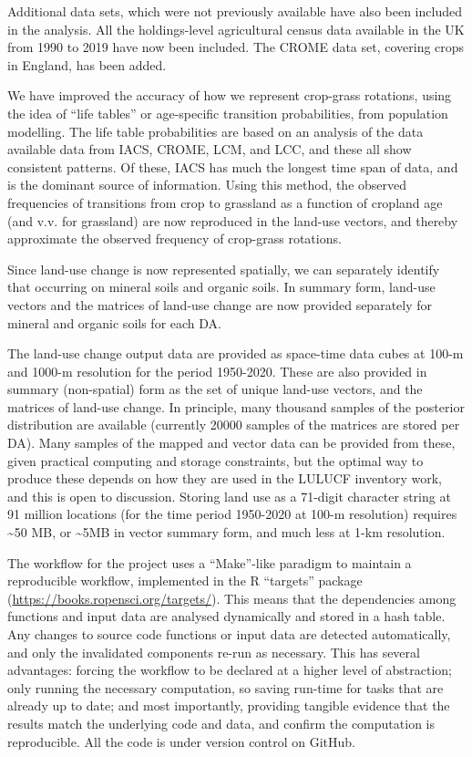\documentclass[
]{book}
\begin{document}
Additional data sets, which were not previously available have also been included in the analysis. All the holdings-level agricultural census data available in the UK from 1990 to 2019 have now been included. The CROME data set, covering crops in England, has been added.

We have improved the accuracy of how we represent crop-grass rotations, using the idea of ``life tables'' or age-specific transition probabilities, from population modelling. The life table probabilities are based on an analysis of the data available data from IACS, CROME, LCM, and LCC, and these all show consistent patterns. Of these, IACS has much the longest time span of data, and is the dominant source of information. Using this method, the observed frequencies of transitions from crop to grassland as a function of cropland age (and v.v. for grassland) are now reproduced in the land-use vectors, and thereby approximate the observed frequency of crop-grass rotations.

Since land-use change is now represented spatially, we can separately identify that occurring on mineral soils and organic soils. In summary form, land-use vectors and the matrices of land-use change are now provided separately for mineral and organic soils for each DA.

The land-use change output data are provided as space-time data cubes at 100-m and 1000-m resolution for the period 1950-2020. These are also provided in summary (non-spatial) form as the set of unique land-use vectors, and the matrices of land-use change. In principle, many thousand samples of the posterior distribution are available (currently 20000 samples of the matrices are stored per DA). Many samples of the mapped and vector data can be provided from these, given practical computing and storage constraints, but the optimal way to produce these depends on how they are used in the LULUCF inventory work, and this is open to discussion. Storing land use as a 71-digit character string at 91 million locations (for the time period 1950-2020 at 100-m resolution) requires \textasciitilde50 MB, or \textasciitilde5MB in vector summary form, and much less at 1-km resolution.

The workflow for the project uses a ``Make''-like paradigm to maintain a reproducible workflow, implemented in the R ``targets'' package (\url{https://books.ropensci.org/targets/}). This means that the dependencies among functions and input data are analysed dynamically and stored in a hash table. Any changes to source code functions or input data are detected automatically, and only the invalidated components re-run as necessary. This has several advantages: forcing the workflow to be declared at a higher level of abstraction; only running the necessary computation, so saving run-time for tasks that are already up to date; and most importantly, providing tangible evidence that the results match the underlying code and data, and confirm the computation is reproducible. All the code is under version control on GitHub.
\end{document}
